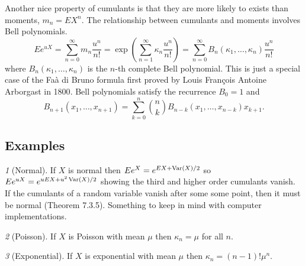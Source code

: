 \documentclass[11pt]{article}
\newcommand{\Var}{\mathop{\rm{Var}}}
\theoremstyle{remark}
\newtheorem*{example}{}
\begin{document}
Another nice property of cumulants is that they are more likely
to exists than moments, \(m_n = EX^n\).
The relationship between cumulants and moments involves Bell
polynomials\cite{Bel1934}.
\[
Ee^{uX} = \sum_{n=0}^\infty m_n \frac{u^n}{n!}
 = \exp(\sum_{n=1}^\infty \kappa_n \frac{u^n}{n!})
= \sum_{n=0}^\infty B_n(\kappa_1,\dots,\kappa_n) \frac{u^n}{n!}
\]
where \(B_n(\kappa_1,\dots,\kappa_n)\) is the \(n\)-th complete
Bell polynomial.
This is just a special case of the
Fa\`a di Bruno formula first proved by Louis Fran\c{c}ois Antoine
Arborgast in 1800\cite{Arb1800}.
Bell polynomials satisfy the recurrence \cite{Com1974} \(B_0 = 1\) and
\[
B_{n+1}(x_1,\dots,x_{n+1}) = \sum_{k=0}^n \binom{n}{k}
B_{n - k}(x_1,\dots, x_{n - k}) x_{k+1}.
\]

\subsection{Examples}
\begin{example}[Normal]
If \(X\) is normal then \(Ee^X = e^{E X + \Var(X)/2}\) so
\(Ee^{uX} = e^{uEX + u^2\Var(X)/2}\) showing the
third and higher order cumulants vanish. If the cumulants of
a random variable vanish after some some point, then it must
be normal\cite{Luk1970} (Theorem 7.3.5).
Something to keep in mind with computer
implementations.
\end{example}
\begin{example}[Poisson]
If \(X\) is Poisson
with mean \(\mu\) then \(\kappa_n = \mu\) for all \(n\).
\end{example}
\begin{example}[Exponential]
If \(X\) is exponential with mean \(\mu\) then
\(\kappa_n = (n - 1)!\mu^n\).
\end{example}
\end{document}
